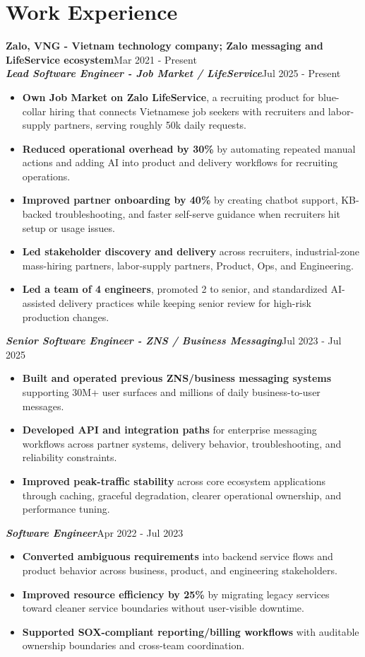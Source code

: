 \documentclass[10pt,letterpaper]{article}
\newcommand{\role}[2]{%
  \textit{\textbf{#1}}\hfill {\small\textcolor{textgray}{#2}}\\[-2pt]
}
\begin{document}
\section*{Work Experience}
\textbf{Zalo, VNG - Vietnam technology company; Zalo messaging and LifeService ecosystem}\hfill {\small\textcolor{textgray}{Mar 2021 - Present}}\\
\role{Lead Software Engineer - Job Market / LifeService}{Jul 2025 - Present}
\begin{itemize}
  \item \textbf{Own Job Market on Zalo LifeService}, a recruiting product for blue-collar hiring that connects Vietnamese job seekers with recruiters and labor-supply partners, serving roughly 50k daily requests.
  \item \textbf{Reduced operational overhead by 30\%} by automating repeated manual actions and adding AI into product and delivery workflows for recruiting operations.
  \item \textbf{Improved partner onboarding by 40\%} by creating chatbot support, KB-backed troubleshooting, and faster self-serve guidance when recruiters hit setup or usage issues.
  \item \textbf{Led stakeholder discovery and delivery} across recruiters, industrial-zone mass-hiring partners, labor-supply partners, Product, Ops, and Engineering.
  \item \textbf{Led a team of 4 engineers}, promoted 2 to senior, and standardized AI-assisted delivery practices while keeping senior review for high-risk production changes.
\end{itemize}

\role{Senior Software Engineer - ZNS / Business Messaging}{Jul 2023 - Jul 2025}
\begin{itemize}
  \item \textbf{Built and operated previous ZNS/business messaging systems} supporting 30M+ user surfaces and millions of daily business-to-user messages.
  \item \textbf{Developed API and integration paths} for enterprise messaging workflows across partner systems, delivery behavior, troubleshooting, and reliability constraints.
  \item \textbf{Improved peak-traffic stability} across core ecosystem applications through caching, graceful degradation, clearer operational ownership, and performance tuning.
\end{itemize}

\role{Software Engineer}{Apr 2022 - Jul 2023}
\begin{itemize}
  \item \textbf{Converted ambiguous requirements} into backend service flows and product behavior across business, product, and engineering stakeholders.
  \item \textbf{Improved resource efficiency by 25\%} by migrating legacy services toward cleaner service boundaries without user-visible downtime.
  \item \textbf{Supported SOX-compliant reporting/billing workflows} with auditable ownership boundaries and cross-team coordination.
\end{itemize}
\end{document}
